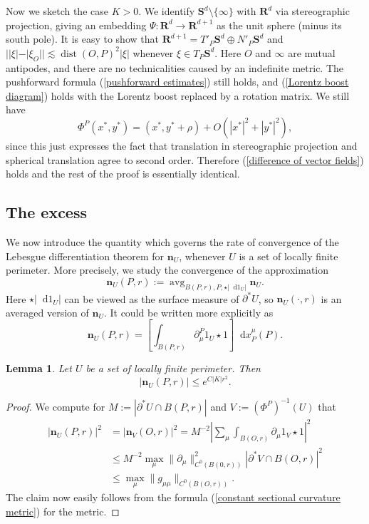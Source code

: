 \documentclass[reqno,11pt]{amsart}
\newcommand{\RR}{\mathbf{R}}
\newcommand{\Sph}{\mathbf S}
\DeclareMathOperator{\avg}{avg}
\newcommand*\dif{\mathop{}\!\mathrm{d}}
\DeclareMathOperator{\dist}{dist}
\newcommand{\normal}{\mathbf n}
\newtheorem{lemma}[theorem]{Lemma}
\theoremstyle{definition}
\numberwithin{equation}{section}
\begin{document}
Now we sketch the case $K > 0$.
We identify $\Sph^d \setminus \{\infty\}$ with $\RR^d$ via stereographic projection, giving an embedding $\Psi: \RR^d \to \RR^{d + 1}$ as the unit sphere (minus its south pole).
It is easy to show that $\RR^{d + 1} = T'_P \Sph^d \oplus N'_P \Sph^d$ and $||\xi| - |\xi_O|| \lesssim \dist(O, P)^2 |\xi|$ whenever $\xi \in T_P \Sph^d$.
Here $O$ and $\infty$ are mutual antipodes, and there are no technicalities caused by an indefinite metric.
The pushforward formula (\ref{pushforward estimates}) still holds, and (\ref{Lorentz boost diagram}) holds with the Lorentz boost replaced by a rotation matrix.
We still have
$$\Phi^P(x^*, y^*) = (x^*, y^* + \rho) + O(|x^*|^2 + |y^*|^2),$$
since this just expresses the fact that translation in stereographic projection and spherical translation agree to second order.
Therefore (\ref{difference of vector fields}) holds and the rest of the proof is essentially identical.


\subsection{The excess}
We now introduce the quantity which governs the rate of convergence of the Lebesgue differentiation theorem for $\normal_U$, whenever $U$ is a set of locally finite perimeter.
More precisely, we study the convergence of the approximation
$$\normal_U(P, r) := \avg_{B(P, r), P, \star |\dif 1_U|} \normal_U.$$
Here $\star |\dif 1_U|$ can be viewed as the surface measure of $\partial^* U$, so $\normal_U(\cdot, r)$ is an averaged version of $\normal_U$.
It could be written more explicitly as
$$\normal_U(P, r) = \left[\int_{B(P, r)} \partial_\mu^P 1_U \star 1\right] \dif x_P^\mu(P).$$

\begin{lemma}\label{gauge invariance of the normal}
Let $U$ be a set of locally finite perimeter. Then
$$|\normal_U(P, r)| \leq e^{C|K|r^2}.$$
\end{lemma}
\begin{proof}
We compute for $M := |\partial^* U \cap B(P, r)|$ and $V := (\Phi^P)^{-1}(U)$ that
\begin{align*}
|\normal_U(P, r)|^2 &= |\normal_V(O, r)|^2 = M^{-2} \left|\sum_\mu \int_{B(O, r)} \partial_\mu 1_V \star 1\right|^2 \\
&\leq M^{-2} \max_\mu \|\partial_\mu\|_{C^0(B(0, r))}^2 |\partial^* V \cap B(O, r)|^2 \\
&\leq \max_\mu \|g_{\mu\mu}\|_{C^0(B(O, r))}.
\end{align*}
The claim now easily follows from the formula (\ref{constant sectional curvature metric}) for the metric.
\end{proof}
\end{document}
